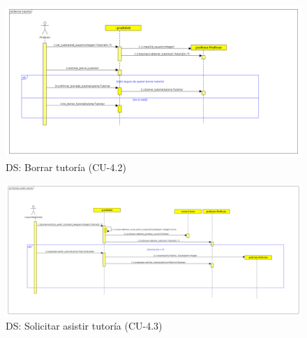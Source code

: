 \begin{figure}[H] %
\centering
\includegraphics[scale=0.27]{imagenes/diagramas/secuencia/analisis/borrar_tutoria.png}  %

\caption{DS: Borrar tutoría (CU-4.2) }\label{figura78}

\end{figure}

\begin{figure}[H] %
\centering
\includegraphics[scale=0.22]{imagenes/diagramas/secuencia/analisis/asistir_tutoria.png}  %

\caption{DS: Solicitar asistir tutoría (CU-4.3) }\label{figura79}

\end{figure}


